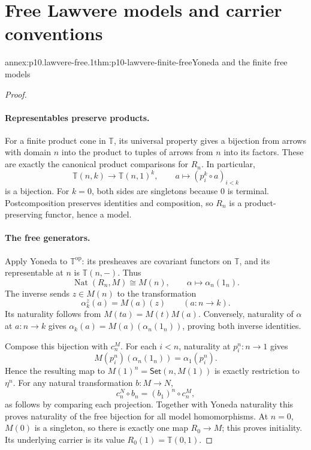
\section{Free Lawvere models and carrier conventions}

\begin{annexitem}{annex:p10.lawvere-free.1}{thm:p10-lawvere-finite-free}{Yoneda and the finite free models}
\begin{proof}
\paragraph{Representables preserve products.}
For a finite product cone in \(\mathbb T\), its universal property gives
a bijection from arrows with domain \(n\) into the product to tuples of
arrows from \(n\) into its factors.
These are exactly the canonical product comparisons for \(R_n\).
In particular,
\[
 \mathbb T(n,k)\longrightarrow\mathbb T(n,1)^k,
 \qquad a\longmapsto(p_i^k\circ a)_{i<k}
\]
is a bijection.  For \(k=0\), both sides are singletons because \(0\)
is terminal.  Postcomposition preserves identities and composition,
so \(R_n\) is a product-preserving functor, hence a model.

\paragraph{The free generators.}
Apply Yoneda to \(\mathbb T^{\mathrm{op}}\): its presheaves are
covariant functors on \(\mathbb T\), and its representable at \(n\)
is \(\mathbb T(n,-)\).  Thus
\[
 \operatorname{Nat}(R_n,M)\cong M(n),
 \qquad \alpha\longmapsto\alpha_n(1_n).
\]
The inverse sends \(z\in M(n)\) to the transformation
\[
 \alpha^z_k(a)=M(a)(z)\qquad(a:n\to k).
\]
Its naturality follows from \(M(t a)=M(t)M(a)\).
Conversely, naturality of \(\alpha\) at \(a:n\to k\) gives
\(\alpha_k(a)=M(a)(\alpha_n(1_n))\), proving both inverse identities.

Compose this bijection with \(c_n^M\).
For each \(i<n\), naturality at \(p_i^n:n\to1\) gives
\[
 M(p_i^n)(\alpha_n(1_n))=\alpha_1(p_i^n).
\]
Hence the resulting map to \(M(1)^n=\mathsf{Set}(n,M(1))\) is exactly
restriction to \(\eta^n\).
For any natural transformation \(b:M\to N\),
\[
 c_n^N\circ b_n=(b_1)^n\circ c_n^M,
\]
as follows by comparing each projection.
Together with Yoneda naturality this proves naturality of the free
bijection for all model homomorphisms.
At \(n=0\), \(M(0)\) is a singleton, so there is exactly one map
\(R_0\to M\); this proves initiality.
Its underlying carrier is its value \(R_0(1)=\mathbb T(0,1)\).


\end{proof}
\end{annexitem}
